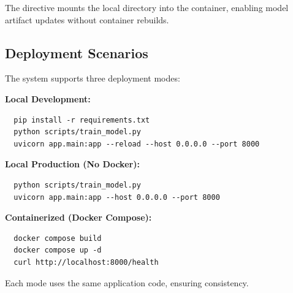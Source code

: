The  directive mounts the local  directory into the container, enabling 
model artifact updates without container rebuilds.

\subsection{Deployment Scenarios}

The system supports three deployment modes:

\textbf{Local Development:}
\begin{verbatim}
  pip install -r requirements.txt
  python scripts/train_model.py
  uvicorn app.main:app --reload --host 0.0.0.0 --port 8000
\end{verbatim}

\textbf{Local Production (No Docker):}
\begin{verbatim}
  python scripts/train_model.py
  uvicorn app.main:app --host 0.0.0.0 --port 8000
\end{verbatim}

\textbf{Containerized (Docker Compose):}
\begin{verbatim}
  docker compose build
  docker compose up -d
  curl http://localhost:8000/health
\end{verbatim}

Each mode uses the same application code, ensuring consistency.
